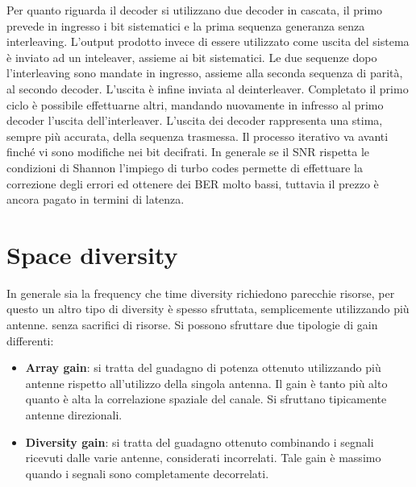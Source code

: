 Per quanto riguarda il decoder si utilizzano due decoder in cascata, il primo prevede in ingresso i bit sistematici e la prima sequenza generanza senza interleaving. L'output prodotto invece di essere utilizzato come uscita del sistema è inviato ad un inteleaver, assieme ai bit sistematici. 
Le due sequenze dopo l'interleaving sono mandate in ingresso, assieme alla seconda sequenza di parità, al secondo decoder. L'uscita è infine inviata al deinterleaver. 
Completato il primo ciclo è possibile effettuarne altri, mandando nuovamente in infresso al primo decoder l'uscita dell'interleaver. 
L'uscita dei decoder rappresenta una stima, sempre più accurata, della sequenza trasmessa. Il processo iterativo va avanti finché vi sono modifiche nei bit decifrati.
In generale se il SNR rispetta le condizioni di Shannon l'impiego di turbo codes permette di effettuare la correzione degli errori ed ottenere dei BER molto bassi, tuttavia il prezzo è ancora pagato in termini di latenza.
\begin{center}
\end{center}
\section*{Space diversity}

In generale sia la frequency che time diversity richiedono parecchie risorse, per questo un altro tipo di diversity è spesso sfruttata, semplicemente utilizzando più antenne. senza sacrifici di risorse. Si possono sfruttare due tipologie di gain differenti:
\begin{itemize}
    \item \textbf{Array gain}: si tratta del guadagno di potenza ottenuto utilizzando più antenne rispetto all'utilizzo della singola antenna. Il gain è tanto più alto quanto è alta la correlazione spaziale del canale. Si sfruttano tipicamente antenne direzionali.
    \item \textbf{Diversity gain}: si tratta del guadagno ottenuto combinando i segnali ricevuti dalle varie antenne, considerati incorrelati. Tale gain è massimo quando i segnali sono completamente decorrelati. 
\end{itemize} 

